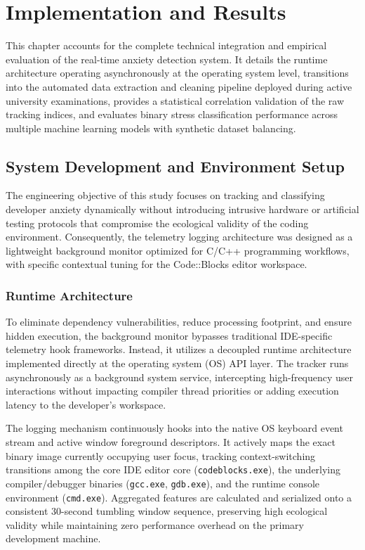 \chapter{Implementation and Results}

This chapter accounts for the complete technical integration and empirical evaluation of the real-time anxiety detection system. It details the runtime architecture operating asynchronously at the operating system level, transitions into the automated data extraction and cleaning pipeline deployed during active university examinations, provides a statistical correlation validation of the raw tracking indices, and evaluates binary stress classification performance across multiple machine learning models with synthetic dataset balancing.

\section{System Development and Environment Setup}
The engineering objective of this study focuses on tracking and classifying developer anxiety dynamically without introducing intrusive hardware or artificial testing protocols that compromise the ecological validity of the coding environment. Consequently, the telemetry logging architecture was designed as a lightweight background monitor optimized for C/C++ programming workflows, with specific contextual tuning for the Code::Blocks editor workspace.

\subsection{Runtime Architecture}
To eliminate dependency vulnerabilities, reduce processing footprint, and ensure hidden execution, the background monitor bypasses traditional IDE-specific telemetry hook frameworks. Instead, it utilizes a decoupled runtime architecture implemented directly at the operating system (OS) API layer. The tracker runs asynchronously as a background system service, intercepting high-frequency user interactions without impacting compiler thread priorities or adding execution latency to the developer’s workspace. 

\noindent The logging mechanism continuously hooks into the native OS keyboard event stream and active window foreground descriptors. It actively maps the exact binary image currently occupying user focus, tracking context-switching transitions among the core IDE editor core (\texttt{codeblocks.exe}), the underlying compiler/debugger binaries (\texttt{gcc.exe}, \texttt{gdb.exe}), and the runtime console environment (\texttt{cmd.exe}). Aggregated features are calculated and serialized onto a consistent 30-second tumbling window sequence, preserving high ecological validity while maintaining zero performance overhead on the primary development machine.

